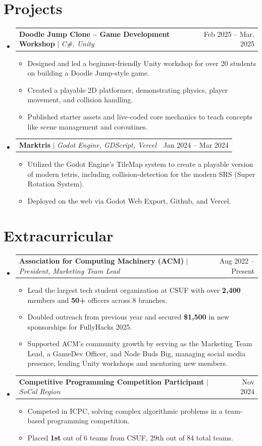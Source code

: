 \documentclass[letterpaper,11pt]{article}
\makeatletter
\newcommand{\resumeItem}[1]{
  \item\small{
    {#1 \vspace{-2pt}}
  }
}
\newcommand{\resumeProjectHeading}[2]{
    \item
    \begin{tabular*}{0.97\textwidth}{l@{\extracolsep{\fill}}r}
      \small#1 & #2 \\
    \end{tabular*}\vspace{-7pt}
}
\newcommand{\resumeSubHeadingListStart}{\begin{itemize}[leftmargin=0.15in, label={}]}
\newcommand{\resumeSubHeadingListEnd}{\end{itemize}}
\newcommand{\resumeItemListStart}{\begin{itemize}}
\newcommand{\resumeItemListEnd}{\end{itemize}\vspace{-5pt}}
\makeatother
\begin{document}
\section{Projects}
    \resumeSubHeadingListStart
      \resumeProjectHeading
          {\textbf{Doodle Jump Clone – Game Development Workshop} $|$ \emph{C\#, Unity}}{Feb 2025 -- Mar. 2025}
          \resumeItemListStart
            \resumeItem{Designed and led a beginner-friendly Unity workshop for over 20 students on building a Doodle Jump-style game.}
            \resumeItem{Created a playable 2D platformer, demonstrating physics, player movement, and collision handling.}
            \resumeItem{Published starter assets and live-coded core mechanics to teach concepts like scene management and coroutines.}
          \resumeItemListEnd
      \resumeProjectHeading
          {\textbf{Marktris} $|$ \emph{Godot Engine, GDScript, Vercel}}{Jan 2024 -- Mar 2024}
          \resumeItemListStart
            \resumeItem{Utilized the Godot Engine's TileMap system to create a playable version of modern tetris, including collision-detection for the modern SRS (Super Rotation System).}
            \resumeItem{Deployed on the web via Godot Web Export, Github, and Vercel.}
          \resumeItemListEnd
    \resumeSubHeadingListEnd

\section{Extracurricular}

    \resumeSubHeadingListStart
    
      \resumeProjectHeading
          {\textbf{Association for Computing Machinery (ACM)} $|$ \emph{President, Marketing Team Lead}}{Aug 2022 -- Present}
          \resumeItemListStart
            \resumeItem{Lead the largest tech student organization at CSUF with over \textbf{2,400} members and \textbf{50+} officers across 8 branches.}
            \resumeItem{Doubled outreach from previous year and secured \textbf{\$1,500} in new sponsorships for FullyHacks 2025.}
            \resumeItem{Supported ACM’s community growth by serving as the Marketing Team Lead, a GameDev Officer, and Node Buds Big, managing social media presence, leading Unity workshops and mentoring new members.}
          \resumeItemListEnd

      \resumeProjectHeading
          {\textbf{Competitive Programming Competition Participant} $|$ \emph{SoCal Region}}{Nov 2024}
          \resumeItemListStart
            \resumeItem{Competed in ICPC, solving complex algorithmic problems in a team-based programming competition.}
            \resumeItem{Placed \textbf{1st} out of 6 teams from CSUF, 29th out of 84 total teams.}
          \resumeItemListEnd
          
    \resumeSubHeadingListEnd


\end{document}
